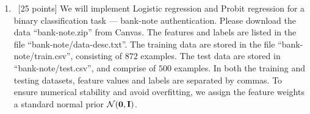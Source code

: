 \documentclass[12pt, fullpage,letterpaper]{article}
\begin{document}
\begin{enumerate}
\begin{enumerate}
{		
	}
	\end{enumerate}
	
	\item~[25 points] We will implement  Logistic regression and Probit regression for a binary classification task --- bank-note authentication. Please download the data ``bank-note.zip'' from Canvas. The features and labels are listed in the file ``bank-note/data-desc.txt''. The training data are stored in the file ``bank-note/train.csv'', consisting of $872$ examples. The test data are stored in ``bank-note/test.csv'', and comprise of $500$ examples. In both the training and testing datasets, feature values and labels are separated by commas. To ensure numerical stability and avoid overfitting, we assign the feature weights a standard normal prior $\mathcal{N}({\bf 0}, {\bf I})$.  
	\begin{enumerate}


\end{enumerate}
\end{enumerate}
\end{document}
